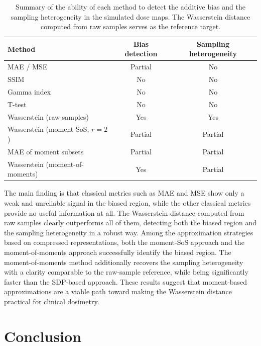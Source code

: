 \documentclass[12pt]{article}
\begin{document}
\begin{table}[h]
    \centering
    \begin{tabular}{lcc}
        \toprule
        \textbf{Method} & \textbf{Bias detection}
                        & \textbf{Sampling heterogeneity} \\
        \midrule
        MAE / MSE                           & Partial  & No       \\
        SSIM                                & No       & No       \\
        Gamma index                         & No       & No       \\
        T-test                              & No       & No       \\
        Wasserstein (raw samples)           & Yes      & Yes      \\
        Wasserstein (moment-SoS, $r=2$)     & Partial  & Partial  \\
        MAE of moment subsets               & Partial  & Partial  \\
        Wasserstein (moment-of-moments)     & Yes      & Partial  \\
        \bottomrule
    \end{tabular}
    \caption{Summary of the ability of each method to detect the additive bias
    and the sampling heterogeneity in the simulated dose maps. The Wasserstein
    distance computed from raw samples serves as the reference target.}
    \label{tab:summary}
\end{table}
 
The main finding is that classical metrics such as MAE and MSE show only a weak 
and unreliable signal in the biased region, while the other classical metrics 
provide no useful information at all. The Wasserstein distance computed from raw 
samples clearly outperforms all of them, detecting both the biased region and the sampling heterogeneity in a robust way. Among
the approximation strategies based on compressed representations, both the
moment-SoS approach and the moment-of-moments approach successfully identify
the biased region. The moment-of-moments method additionally recovers the
sampling heterogeneity with a clarity comparable to the raw-sample reference,
while being significantly faster than the SDP-based approach. These results
suggest that moment-based approximations are a viable path toward making the
Wasserstein distance practical for clinical dosimetry.

\section{Conclusion}
\newpage
\end{document}
